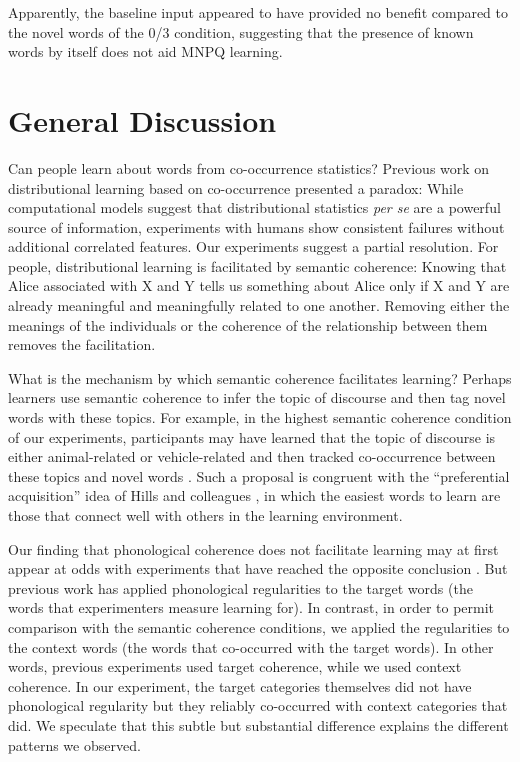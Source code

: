 \documentclass[man,longtable, floatmark]{my-apa6}
\begin{document}
Apparently, the baseline input appeared to have provided no benefit compared to the novel words of the 0/3 condition, suggesting that the presence of known words by itself does not aid MNPQ learning.

\section{General Discussion}

Can people learn about words from co-occurrence statistics? Previous work on distributional learning based on co-occurrence presented a paradox: While computational models suggest that distributional statistics \emph{per se} are a powerful source of information, experiments with humans show consistent failures without additional correlated features. Our experiments suggest a partial resolution. For people, distributional learning is facilitated by semantic coherence: Knowing that Alice associated with X and Y tells us something about Alice only if X and Y are already meaningful and meaningfully related to one another. Removing either the meanings of the individuals or the coherence of the relationship between them removes the facilitation.

What is the mechanism by which semantic coherence facilitates learning? Perhaps learners use semantic coherence to infer the topic of discourse and then tag novel words with these topics. For example, in the highest semantic coherence condition of our experiments, participants may have learned that the topic of discourse is either animal-related or vehicle-related and then tracked co-occurrence between these topics and novel words \citep{frank2013}. Such a proposal is congruent with the ``preferential acquisition'' idea of Hills and colleagues \citeyearpar{hills2009, hills2010}, in which the easiest words to learn are those that connect well with others in the learning environment.

Our finding that phonological coherence does not facilitate learning may at first appear at odds with experiments that have reached the opposite conclusion \citep{frigo1998, lany2010, monaghan2005}. But previous work has applied phonological regularities to the target words (the words that experimenters measure learning for).  In contrast, in order to permit comparison with the semantic coherence conditions, we applied the regularities to the context words (the words that co-occurred with the target words). In other words, previous experiments used target coherence, while we used context coherence. In our experiment, the target categories themselves did not have phonological regularity but they reliably co-occurred with context categories that did. We speculate that this subtle but substantial difference explains the different patterns we observed.
\end{document}

